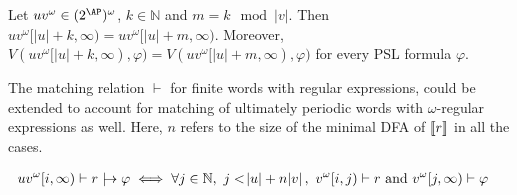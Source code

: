 	Let $uv^\omega\in(2^\AP)^\omega$,  $k\in{\mathbb N}$ and $m=k\mod |v|$.
	Then $uv^\omega[|u|+k,\infty)=uv^\omega[|u|+m,\infty)$.
	Moreover, $V(uv^\omega[|u|+k,\infty),\varphi)=V(uv^\omega[|u|+m,\infty),\varphi)$ for every  PSL formula $\varphi$.


\begin{definition}
The matching relation $\vdash$ for finite words with regular expressions, could be extended to account for matching of ultimately periodic words with $\omega$-regular expressions as well. Here, $n$ refers to the size of the minimal DFA of ${\llbracket}r{\rrbracket}$ in all the cases.

 \begin{align*}
        uv^\omega[i,\infty)\vdash  r\triggers \varphi   &\iff  \forall j \in\mathbb{N},\ j<\abs{u}+n\abs{v},\ v^\omega[i,j)\vdash r  \text{ and } v^\omega[j,\infty) \vdash \varphi
\end{align*}
\end{definition} 